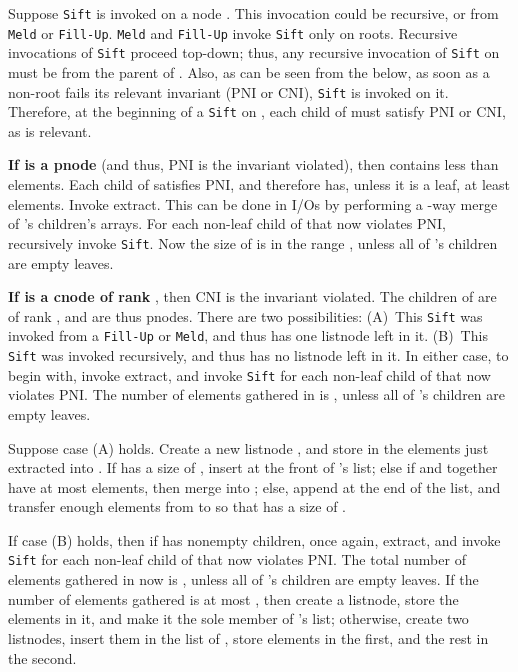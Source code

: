 Suppose {\tt Sift} is invoked on a node . 
This invocation could be recursive, or from {\tt Meld} or {\tt Fill-Up}.
{\tt Meld} and {\tt Fill-Up} invoke {\tt Sift} only on roots.
Recursive invocations of {\tt Sift} proceed top-down; thus, any recursive
	invocation of {\tt Sift} on  must be from the parent of . 
Also, as can be seen from the below, 
	as soon as a non-root fails its relevant invariant (PNI or CNI),
	{\tt Sift} is invoked on it.
Therefore, at the beginning of a {\tt Sift} on , each child of  must
	satisfy PNI or CNI, as is relevant.   


{\bf If  is a pnode} (and thus, PNI is the invariant violated), then
	 contains less than  elements.
Each child of  satisfies PNI, and therefore has, unless it is a leaf,  
	at least  elements.  
Invoke extract.
This can be done in  I/Os by performing a -way merge of 's children's arrays. 
For each non-leaf child  of  that now violates PNI, recursively invoke {\tt Sift}.
Now the size of  is in the range , unless 
all of 's children are empty leaves. 

{\bf If  is a cnode of rank }, then CNI is the invariant violated.
The children of  are of rank , and are thus pnodes.
There are two possibilities: (A)~This {\tt Sift} was invoked from a {\tt Fill-Up} or {\tt Meld}, and thus
	 has one listnode  left in it. (B)~This {\tt Sift} was invoked recursively, and thus
	 has no listnode left in it.
In either case, to begin with, invoke extract, and invoke {\tt Sift} 
	for each non-leaf child  of  that now violates PNI.
The number of elements gathered in  is , 
	unless all of 's children are empty leaves. 
 
Suppose case (A) holds. 
Create a new listnode , and store in  the elements just extracted into .
If  has a size of , insert  at the front of 's list;
	else if  and  together have at most  elements, then
	merge  into ;
	else, append  at the end of the list, and transfer enough elements
	from  to  so that  has a size of .

If case (B) holds, then if  has nonempty children, once again, extract, and invoke {\tt Sift} 
	for each non-leaf child  of  that now violates PNI.
The total number of elements gathered in  now is , 
	unless all of 's children are empty leaves. 
If the number of elements gathered is at most ,
	then create a listnode, store the elements in it, and make it the sole member
	of 's list;
otherwise, create two listnodes, insert them in the list of , store  elements in the first, 
	and the rest in the second.
 

